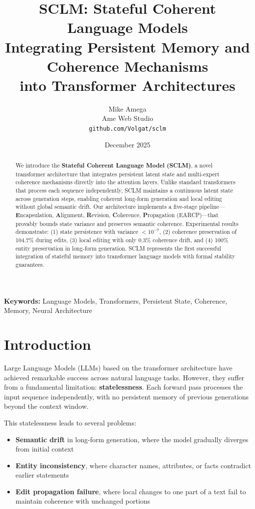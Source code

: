 \documentclass[11pt,a4paper]{article}
\title{\textbf{SCLM: Stateful Coherent Language Models}\\[0.5em]
\large Integrating Persistent Memory and Coherence Mechanisms\\into Transformer Architectures}
\author{
Mike Amega\\
Ame Web Studio\\
\texttt{github.com/Volgat/sclm}
}
\date{December 2025}
\begin{document}
\maketitle

\begin{abstract}
We introduce the \textbf{Stateful Coherent Language Model (SCLM)}, a novel transformer architecture that integrates persistent latent state and multi-expert coherence mechanisms directly into the attention layers. Unlike standard transformers that process each sequence independently, SCLM maintains a continuous latent state across generation steps, enabling coherent long-form generation and local editing without global semantic drift. Our architecture implements a five-stage pipeline—\textbf{E}ncapsulation, \textbf{A}lignment, \textbf{R}evision, \textbf{C}oherence, \textbf{P}ropagation (EARCP)—that provably bounds state variance and preserves semantic coherence. Experimental results demonstrate: (1) state persistence with variance $< 10^{-7}$, (2) coherence preservation of 104.7\% during edits, (3) local editing with only 0.3\% coherence drift, and (4) 100\% entity preservation in long-form generation. SCLM represents the first successful integration of stateful memory into transformer language models with formal stability guarantees.
\end{abstract}

\textbf{Keywords:} Language Models, Transformers, Persistent State, Coherence, Memory, Neural Architecture

\section{Introduction}

Large Language Models (LLMs) based on the transformer architecture \citep{vaswani2017attention} have achieved remarkable success across natural language tasks. However, they suffer from a fundamental limitation: \textbf{statelessness}. Each forward pass processes the input sequence independently, with no persistent memory of previous generations beyond the context window.

This statelessness leads to several problems:
\begin{itemize}
    \item \textbf{Semantic drift} in long-form generation, where the model gradually diverges from initial context
    \item \textbf{Entity inconsistency}, where character names, attributes, or facts contradict earlier statements
    \item \textbf{Edit propagation failure}, where local changes to one part of a text fail to maintain coherence with unchanged portions
\end{itemize}
\end{document}
